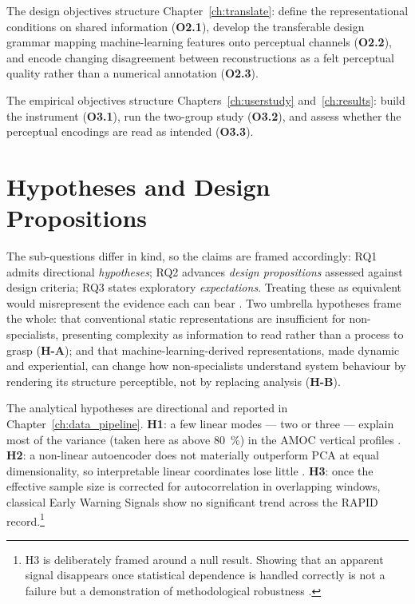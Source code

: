 The design objectives structure Chapter~\ref{ch:translate}: define the representational conditions on shared information (\textbf{O2.1}), develop the transferable design grammar mapping machine-learning features onto perceptual channels (\textbf{O2.2}), and encode changing disagreement between reconstructions as a felt perceptual quality rather than a numerical annotation (\textbf{O2.3}).

The empirical objectives structure Chapters~\ref{ch:userstudy} and~\ref{ch:results}: build the instrument (\textbf{O3.1}), run the two-group study (\textbf{O3.2}), and assess whether the perceptual encodings are read as intended (\textbf{O3.3}).

\section{Hypotheses and Design Propositions}
\label{sec:hypotheses}

The sub-questions differ in kind, so the claims are framed accordingly: RQ1 admits directional \emph{hypotheses}; RQ2 advances \emph{design propositions} assessed against design criteria; RQ3 states exploratory \emph{expectations}. Treating these as equivalent would misrepresent the evidence each can bear \citep{cronbach1975, mckenney2018}. Two umbrella hypotheses frame the whole: that conventional static representations are insufficient for non-specialists, presenting complexity as information to read rather than a process to grasp (\textbf{H-A}); and that machine-learning-derived representations, made dynamic and experiential, can change how non-specialists understand system behaviour by rendering its structure perceptible, not by replacing analysis (\textbf{H-B}).

The analytical hypotheses are directional and reported in Chapter~\ref{ch:data_pipeline}. \textbf{H1}: a few linear modes --- two or three --- explain most of the variance (taken here as above \SI{80}{\percent}) in the AMOC vertical profiles \citep{buckley2016, hannachi2007}. \textbf{H2}: a non-linear autoencoder does not materially outperform PCA at equal dimensionality, so interpretable linear coordinates lose little \citep{baldi1989}. \textbf{H3}: once the effective sample size is corrected for autocorrelation in overlapping windows, classical Early Warning Signals show no significant trend across the RAPID record.\footnote{H3 is deliberately framed around a null result. Showing that an apparent signal disappears once statistical dependence is handled correctly is not a failure but a demonstration of methodological robustness \citep{dakos2012, scheffer2009}.}

